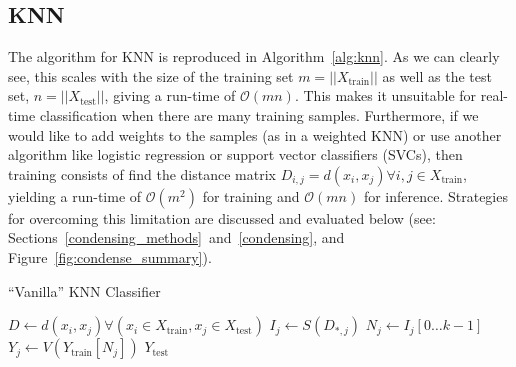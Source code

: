 \documentclass[conference]{IEEEtran}
\begin{document}
\subsection{KNN}
\label{runtime}
The algorithm for KNN is reproduced in Algorithm~\ref{alg:knn}. As we can clearly see, this scales with the size of the training set $m = || X_{\text{train}} || $ as well as the test set, $n = || X_{\text{test}} ||$, giving a run-time of $\mathcal{O}(mn)$.
This makes it unsuitable for real-time classification when there are many training samples. 
Furthermore, if we would like to add weights to the samples (as in a weighted KNN) or use another algorithm like logistic regression or support vector classifiers (SVCs), then training consists of find the distance matrix $D_{i,j} = d(x_i, x_j) \forall i,j \in X_{\text{train}}$, yielding a run-time of $\mathcal{O}(m^2)$ for training and $\mathcal{O}(mn)$ for inference. Strategies for overcoming this limitation are discussed and evaluated below (see: Sections~\ref{condensing_methods}~and~\ref{condensing}, and Figure~\ref{fig:condense_summary}). 



\begin{algorithm}
\begin{algorithmic}
    \caption{``Vanilla'' KNN Classifier}
    \label{alg:knn}
    \State $D \gets d(x_i,x_j) \forall \left( x_i \in X_{\text{train}}, x_j \in X_{\text{test}} \right)$  
       
        \State $I_j \gets S(D_{*,j})$ 
        \State $N_j \gets I_j[0 \ldots k-1]$ 
        \State $Y_j \gets V(Y_{\text{train}}[N_j])$ 
    \EndFor
    \State \Return $Y_{\text{test}}$
\end{algorithmic}
\end{algorithm}
\end{document}
